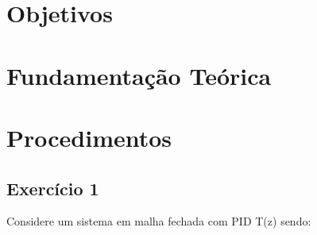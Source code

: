 \section{Objetivos}

\section{Fundamentação Teórica}

\section{Procedimentos}
\subsection{Exercício 1}
Considere um sistema em malha fechada com PID T(z) sendo:

